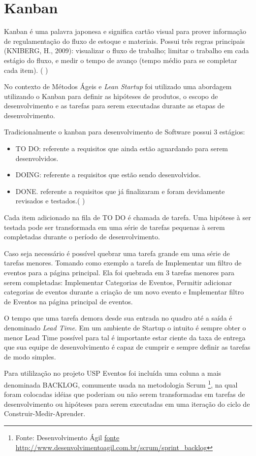 \section{Kanban}
\par Kanban é uma palavra japonesa e significa cartão visual para prover informação de regulamentação do fluxo de estoque e materiais. Possui três regras principais (KNIBERG, H., 2009): visualizar o fluxo de trabalho; limitar o trabalho em cada estágio do fluxo, e medir o tempo de avanço (tempo médio para se completar cada item). ( \cite{francisco:14})
\par No contexto de Métodos Ágeis e \emph{Lean Startup} foi utilizado uma abordagem utilizando o Kanban para definir as hipóteses de produtos,  o escopo de desenvolvimento e as tarefas para serem executadas durante as etapas de desenvolvimento.
\par Tradicionalmente o kanban para desenvolvimento de Software possui 3 estágios:
\begin{itemize}
        \item TO DO: referente a requisitos que ainda estão aguardando para serem
desenvolvidos.
        \item DOING: referente a requisitos que estão sendo desenvolvidos.
        \item DONE. referente a requisitos que já finalizaram e foram devidamente
revisados e testados.( \cite{francisco:14})
\end{itemize}
\par Cada item adicionado na fila de TO DO é chamada de tarefa. Uma hipótese à ser testada pode ser transformada em uma série de tarefas pequenas à serem completadas durante o período de desenvolvimento.
\par Caso seja necessário é possível quebrar uma tarefa grande em uma série de tarefas menores. Tomando como exemplo a tarefa de Implementar um filtro de eventos para a página principal. Ela foi quebrada em 3 tarefas menores para serem completadas: Implementar Categorias de Eventos, Permitir adicionar categorias de eventos durante a criação de um novo evento e Implementar filtro de Eventos na página principal de eventos.
\par O tempo que uma tarefa demora desde sua entrada no quadro até a saída é denominado \emph{Lead Time}. Em um ambiente de Startup o intuito é sempre obter o menor Lead Time possível para tal é importante estar ciente da taxa de entrega que sua equipe de desenvolvimento é capaz de cumprir e sempre definir as tarefas de modo simples. 
\par Para utililzação no projeto USP Eventos foi incluída uma coluna a mais denominada BACKLOG, comumente usada na metodologia Scrum \footnote{Fonte: Desenvolvimento Ágil \url{fonte http://www.desenvolvimentoagil.com.br/scrum/sprint_backlog}},  na qual foram colocadas idéias que poderiam ou não serem transformadas em tarefas de desenvolvimento ou hipóteses para serem executadas em uma iteração do ciclo de Construir-Medir-Aprender.
